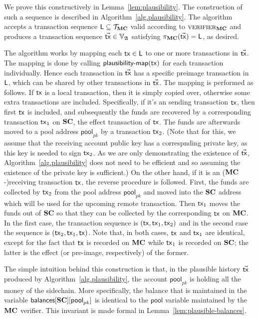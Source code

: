 We prove this constructively in Lemma~\ref{lem:plausibility}. The construction
of such a sequence
is described in Algorithm~\ref{alg.plausibility}. The algorithm accepts a
transaction sequence $\mathsf{L} \subseteq \mathcal{T}_{\mathbf{MC}}$
valid according to
$\textsc{verifier}_{\mathbf{MC}}$ and produces a transaction sequence $\vec{\mathsf{tx}} \in
\mathbb{V}_{\mathfrak{A}}$ satisfying
$\pi_{\mathbf{MC}}(\vec{\mathsf{tx}}) = \mathsf{L}$, as desired.

The algorithm works by mapping each $\mathsf{tx} \in \mathsf{L}$ to one or more transactions in
$\vec{\mathsf{tx}}$. The mapping is done by calling $\textsf{plausibility-map}(\mathsf{tx})$ for
each transaction individually. Hence each transaction in $\vec{\mathsf{tx}}$ has a
specific preimage transaction in $\mathsf{L}$, which can be shared by other transactions
in $\vec{\mathsf{tx}}$. The mapping is performed as follows. If $\mathsf{tx}$ is a local
transaction, then it is simply copied over, otherwise
some extra transactions are included. Specifically, if it's an
sending transaction $\mathsf{tx}$, then first $\mathsf{tx}$ is included, and
subsequently the funds are recovered by a corresponding transaction $\mathsf{tx}_1$ on
$\mathbf{SC}$, the effect transaction of $\mathsf{tx}$. The funds are afterwards moved to a
pool address $\textsf{pool}_{pk}$ by a transaction $\mathsf{tx}_2$.
(Note that for this, we assume that the receiving account public key has a
correspnding private key, as this key is needed to sign $\mathsf{tx}_2$. As we are only
demonstrating the existence of $\vec{\mathsf{tx}}$, Algorithm~\ref{alg.plausibility} does
not need to be efficient and so assuming the existence of the private key is
sufficient.)
On the other hand,
if it is an ($\mathbf{MC}$-)receiving transaction $\mathsf{tx}$, the reverse procedure is
followed. First, the funds are collected by $\mathsf{tx}_2$ from the pool address
$\textsf{pool}_{pk}$ and moved into the $\mathbf{SC}$ address which will be used for the
upcoming remote transaction. Then $\mathsf{tx}_1$ moves the funds out of $\mathbf{SC}$ so that
they can be collected by the corresponding $\mathsf{tx}$ on $\mathbf{MC}$. In the first case, the
transaction sequence is $(\mathsf{tx}, \mathsf{tx}_1, \mathsf{tx}_2)$ and in the second case the
sequence is $(\mathsf{tx}_2, \mathsf{tx}_1, \mathsf{tx})$. Note that, in both cases, $\mathsf{tx}$ and $\mathsf{tx}_1$
are identical, except for the fact that $\mathsf{tx}$ is recorded on $\mathbf{MC}$ while $\mathsf{tx}_1$
is recorded on $\mathbf{SC}$; the latter is the effect (or pre-image, respectively)
of the former.

The simple intuition behind this construction is that, in the plausible history
$\vec{\mathsf{tx}}$ produced by Algorithm~\ref{alg.plausibility}, the account $\textsf{pool}_{pk}$
is holding all the money of the sidechain. More specifically, the
balance that is maintained in the variable
$\textsf{balances}[\mathbf{SC}][\textsf{pool}_{pk}]$ is identical to the $\textsf{pool}$
variable maintained by the $\mathbf{MC}$ verifier. This invariant is made formal in
Lemma~\ref{lem:plausible-balances}.

